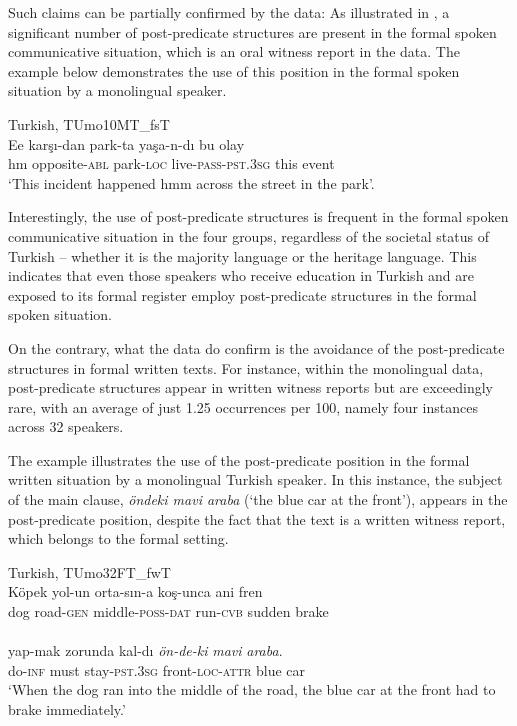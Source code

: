 Such claims can be partially confirmed by the data: As illustrated in , a significant number of post-predicate structures are present in the formal spoken communicative situation, which is an oral witness report in the data. The example  below demonstrates the use of this position in the formal spoken situation by a monolingual speaker.

\ea%
  \label{ex:key:38} Turkish, TUmo10MT\_fsT \\

        \gll Ee  karşı-dan   park-ta    yaşa-n-dı    bu  olay\\
hm  opposite-\textsc{abl}  park\textsc{-loc}  live-\textsc{pass-pst.3sg}  this  event\\
\glt ‘This incident happened hmm across the street in the park’.  \\
  \z

Interestingly, the use of post-predicate structures is frequent in the formal spoken communicative situation in the four groups, regardless of the societal status of Turkish -- whether it is the majority language or the heritage language. This indicates that even those speakers who receive education in Turkish and are exposed to its formal register employ post-predicate structures in the formal spoken situation.

On the contrary, what the data do confirm is the avoidance of the post-predicate structures in formal written texts. For instance, within the monolingual data, post-predicate structures appear in written witness reports but are exceedingly rare, with an average of just 1.25 occurrences per 100, namely four instances across 32 speakers.

The example  illustrates the use of the post-predicate position in the formal written situation by a monolingual Turkish speaker. In this instance, the subject of the main clause, \textit{öndeki mavi araba} (‘the blue car at the front’), appears in the post-predicate position, despite the fact that the text is a written witness report, which belongs to the formal setting.

\ea%
  \label{ex:key:39} Turkish, TUmo32FT\_fwT \\
     \gll Köpek    yol-un    orta-sın-a    koş-unca  ani    fren\\
dog    road-\textsc{gen}  middle-\textsc{poss-dat}  run-\textsc{cvb}  sudden    brake\\
\\
\gll yap-mak  zorunda  kal-dı    \textit{ön-de-ki} \textit{mavi} \textit{araba}. \\
do\textsc{-inf}   must    stay-\textsc{pst.3sg}  front\textsc{-loc-attr}  blue  car\\
\glt ‘When the dog ran into the middle of the road, the blue car at the front had to brake immediately.’ 
  \z

